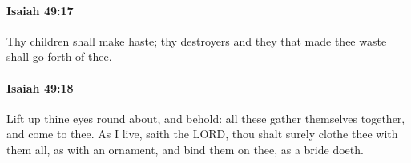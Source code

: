 		\paragraph{Isaiah 49:17} %
			\label{ISAIAH-49-17}

			Thy children shall make haste; thy destroyers and they that made thee waste shall go forth of thee.


		\paragraph{Isaiah 49:18} %
			\label{ISAIAH-49-18}

			Lift up thine eyes round about, and behold: all these gather themselves together, and come to thee. As I live, saith the LORD, thou shalt surely clothe thee with them all, as with an ornament, and bind them on thee, as a bride doeth.


